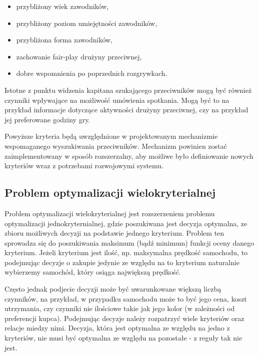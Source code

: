 \begin{itemize}
\item{przybliżony wiek zawodników,}
\item{przybliżony poziom umiejętności zawodników,}
\item{przybliżona forma zawodników,}
\item{zachowanie fair-play drużyny przeciwnej,}
\item{dobre wspomnienia po poprzednich rozgrywkach.}
\end{itemize}

Istotne z punktu widzenia kapitana szukającego przeciwników mogą być również czynniki wpływające na możliwość umówienia spotkania. Mogą być to na przykład informacje dotyczące aktywności drużyny przeciwnej, czy na przykład jej preferowane godziny gry.

Powyższe kryteria będą uwzględnione w projektowanym mechanizmie wspomaganego wyszukiwania przeciwników. Mechanizm powinien zostać zaimplementowany w sposób rozszerzalny, aby możliwe było definiowanie nowych kryteriów wraz z potrzebami rozwojowymi systemu.

\subsection{Problem optymalizacji wielokryterialnej}

Problem optymalizacji wielokryterialnej jest rozszerzeniem problemu optymalizacji jednokryternialnej, gdzie poszukiwana jest decyzja optymalna, ze zbioru możliwych decyzji na podstawie jednego kryterium. Problem ten sprowadza się do poszukiwania maksimum (bądź minimum) funkcji oceny danego kryterium. Jeżeli kryterium jest ilość, np. maksymalna prędkość samochodu, to podejmując decyzje o zakupie jedynie ze względu na to kryterium naturalnie wybierzemy samochód, który osiąga największą prędkość. 

Często jednak podjecie decyzji może być uwarunkowane większą liczbą czynników, na przykład, w przypadku samochodu może to być jego cena, koszt utrzymania, czy czynniki nie ilościowe takie jak jego kolor (w zależności od preferencji kupca). Podejmując decyzje należy rozpatrzyć wiele kryteriów oraz relacje miedzy nimi. Decyzja, która jest optymalna ze względu na jedno z kryteriów, nie musi być optymalna ze względu na pozostałe - z reguły tak nie jest.

